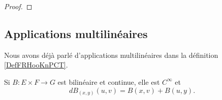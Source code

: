\begin{proof}
%
%
\end{proof}

\subsection{Applications multilinéaires}

Nous avons déjà parlé d'applications multilinéaires dans la définition \ref{DefFRHooKnPCT}.

\begin{lemma}\label{LemFRdNDCd}
    Si \( B\colon E\times F\to G\) est bilinéaire et continue, elle est \(  C^{\infty}\) et
    \begin{equation}    \label{EqXYJgDBt}
        dB_{(x,y)}(u,v)=B(x,v)+B(u,y).
    \end{equation}
\end{lemma}

